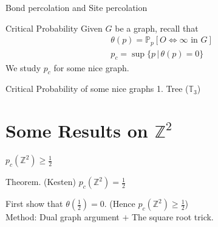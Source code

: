 \documentclass{beamer}
\begin{document}
\begin{frame}{Bond percolation and Site percolation}
    \begin{figure}[htp]
        \centering
        
    \end{figure}
\end{frame}
\begin{frame}{Critical Probability}
    Given $G$ be a graph, recall that 
    \begin{align*}
        &\theta(p)=\mathbb{P}_p[O\Leftrightarrow\infty\mbox{ in }G]\\
         &p_c=\sup\{p\, | \, \theta(p)=0\}
    \end{align*}
    We study $p_c$ for some nice graph.
\end{frame}
\begin{frame}{Critical Probability of some nice graphs}
    1. Tree ($\mathbb{T}_3$)
    \begin{figure}[htp]
        \centering
        
    \end{figure}
\end{frame}

\section{Some Results on $\mathbb{Z}^2$}
\begin{frame}{$p_c(\mathbb{Z}^2)\geq\frac{1}{2}$}
    \begin{block}{Theorem. (Kesten)}
    $p_c(\mathbb{Z}^2)=\frac{1}{2}$
    \end{block}
    First show that $\theta(\frac{1}{2})=0$. (Hence $p_c(\mathbb{Z}^{2})\geq \frac{1}{2}$)\\
    Method: Dual graph argument $+$ The square root trick. 
    \begin{figure}[htp]
    \centering
    
    \end{figure}
\end{frame}
\end{document}
